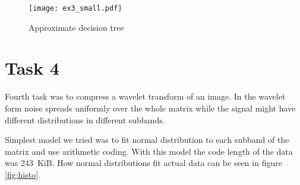 \documentclass{article}
\begin{document}
\begin{figure}
    \begin{center}
	\texttt{[image: ex3\_small.pdf]}
    \end{center}
    \caption{Approximate decision tree}\label{fig:ex3small}
\end{figure}

\section{Task 4}

Fourth task was to compress a wavelet transform of an image. In the wavelet form noise spreads
uniformly over the whole matrix while the signal might have different distributions in different subbands.

Simplest model we tried was to fit normal distribution to each subband of the matrix and use arithmetic coding.
With this model the code length of the data was 243~KiB. How normal distributions fit actual data can be seen in figure \ref{fig:histo}.
\end{document}
